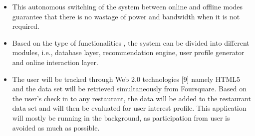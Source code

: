 \documentclass{if-beamer}
\begin{document}
\begin{frame}
	\begin{itemize}
		\item This autonomous 
		switching of the system between online and offline modes 
		guarantee that there is no wastage of power and bandwidth 
		when it is not required. 
			\item Based on the type of functionalities , the system can 
		be divided into different modules, i.e., database layer, 
		recommendation engine, user profile generator and online 
		interaction layer. 
		\item The user will be tracked through Web 2.0 technologies 
		[9] namely HTML5 and the data set will be retrieved 
		simultaneously from Foursquare. Based on the user’s checkin to any restaurant, the data will be added to the restaurant 
		data set and will then be evaluated for user interest profile. 
		This application will mostly be running in the background, 
		as participation from user is avoided as much as possible. 
	\end{itemize}

\end{frame}
\end{document}
